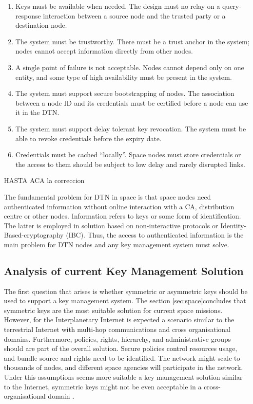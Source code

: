 \begin{enumerate}
    \item Keys must be available when needed. The design must no relay on a query-response interaction between a source node and the trusted party or a destination node.
    \item The system must be trustworthy. There must be a trust anchor in the system; nodes cannot accept information directly from other nodes. 
    \item A single point of failure is not acceptable. Nodes cannot depend only on one entity, and some type of high availability must be present in the system.
    \item The system must support secure bootstrapping of nodes. The association between a node ID and its credentials must be certified before a node can use it in the DTN.
    \item The system must support delay tolerant key revocation. The system must be able to revoke credentials before the expiry date. 
    \item Credentials must be cached ``locally''. Space nodes must store credentials or the access to them should be subject to low delay and rarely disrupted links.
\end{enumerate}

HASTA ACA la correccion

The fundamental problem for DTN in space is that space nodes need authenticated information without online interaction with a CA, distribution centre or other nodes. Information refers to keys or some form of identification. The latter is employed in solution based on non-interactive protocols or Identity-Based-cryptography (IBC). Thus, the access to authenticated information is the main problem for DTN nodes and any key management system must solve.


\subsection{Analysis of current Key Management Solution}


The first question that arises is whether symmetric or asymmetric keys should be used to support a key management system.  The section  \ref{sec:space}concludes that symmetric keys are the most suitable solution for current space missions. However, for the Interplanetary Internet is expected a scenario similar to the terrestrial Internet \cite{rationale2010requirements} with multi-hop communications and cross organisational domains. Furthermore, policies, rights, hierarchy, and administrative groups should are part of the overall solution. Secure policies control resources usage, and bundle source and rights need to be identified. The network might scale to thousands of nodes, and different space agencies will participate in the network. Under this assumptions seems more suitable a key management solution similar to the Internet, symmetric keys might not be even acceptable in a cross-organisational domain \cite{ivancic2009security}.

